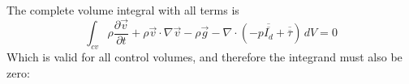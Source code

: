 The complete volume integral with all terms is
\begin{equation*}
	\int_{cv}\rho\frac{\partial \vec v}{\partial t} + \rho \vec v \cdot \nabla \vec v - \rho \vec g - \nabla \cdot (-p\overline{\overline{I_d}}+ \overline{\overline{\tau}}) \,dV = 0
\end{equation*}
Which is valid for all control volumes, and therefore the integrand must also be zero:
